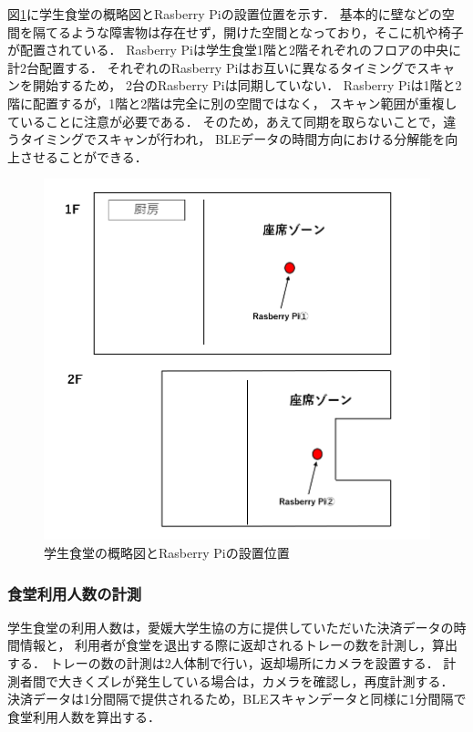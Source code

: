 図\ref{raspi_place}に学生食堂の概略図とRasberry Piの設置位置を示す．
基本的に壁などの空間を隔てるような障害物は存在せず，開けた空間となっており，そこに机や椅子が配置されている．
Rasberry Piは学生食堂1階と2階それぞれのフロアの中央に計2台配置する．
それぞれのRasberry Piはお互いに異なるタイミングでスキャンを開始するため，
2台のRasberry Piは同期していない．
Rasberry Piは1階と2階に配置するが，1階と2階は完全に別の空間ではなく，
スキャン範囲が重複していることに注意が必要である．
そのため，あえて同期を取らないことで，違うタイミングでスキャンが行われ，
BLEデータの時間方向における分解能を向上させることができる．
\begin{figure}[pt]
  \includegraphics[scale=0.4]{./images/place_raspi.png}
  \centering
  \caption{学生食堂の概略図とRasberry Piの設置位置\label{raspi_place}}
\end{figure}

\subsubsection*{食堂利用人数の計測}
学生食堂の利用人数は，愛媛大学生協の方に提供していただいた決済データの時間情報と，
利用者が食堂を退出する際に返却されるトレーの数を計測し，算出する．
トレーの数の計測は2人体制で行い，返却場所にカメラを設置する．
計測者間で大きくズレが発生している場合は，カメラを確認し，再度計測する．
決済データは1分間隔で提供されるため，BLEスキャンデータと同様に1分間隔で食堂利用人数を算出する．

